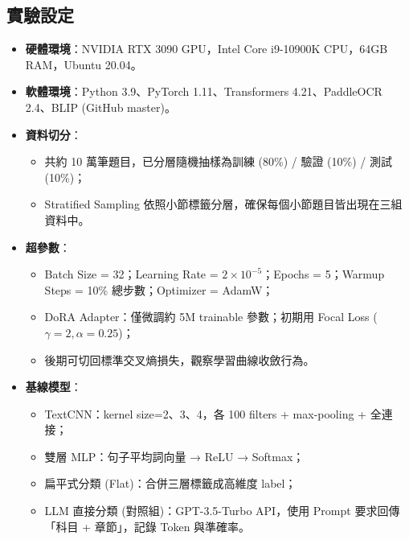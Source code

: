 \documentclass[10pt]{article}
\begin{document}
\begin{CJK}{UTF8}{bsmi}
\subsection{實驗設定}
\begin{itemize}
  \item \textbf{硬體環境}：NVIDIA RTX 3090 GPU，Intel Core i9-10900K CPU，64GB RAM，Ubuntu 20.04。  
  \item \textbf{軟體環境}：Python 3.9、PyTorch 1.11、Transformers 4.21、PaddleOCR 2.4、BLIP (GitHub master)。  
  \item \textbf{資料切分}：  
    \begin{itemize}
      \item 共約 10 萬筆題目，已分層隨機抽樣為訓練 (80\%) / 驗證 (10\%) / 測試 (10\%)；  
      \item Stratified Sampling 依照小節標籤分層，確保每個小節題目皆出現在三組資料中。
    \end{itemize}
  \item \textbf{超參數}：  
    \begin{itemize}
      \item Batch Size = 32；Learning Rate = $2\times10^{-5}$；Epochs = 5；Warmup Steps = 10\% 總步數；Optimizer = AdamW；  
      \item DoRA Adapter：僅微調約 5M trainable 參數；初期用 Focal Loss ($\gamma=2,\alpha=0.25$)；  
      \item 後期可切回標準交叉熵損失，觀察學習曲線收斂行為。
    \end{itemize}
  \item \textbf{基線模型}：  
    \begin{itemize}
      \item TextCNN：kernel size=2、3、4，各 100 filters + max-pooling + 全連接；  
      \item 雙層 MLP：句子平均詞向量 → ReLU → Softmax；  
      \item 扁平式分類 (Flat)：合併三層標籤成高維度 label；  
      \item LLM 直接分類 (對照組)：GPT-3.5-Turbo API，使用 Prompt 要求回傳「科目 + 章節」，記錄 Token 與準確率。
    \end{itemize}
\end{itemize}


\end{CJK}
\end{document}
